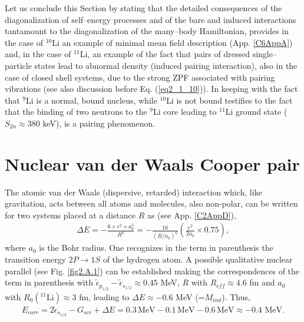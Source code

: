  
 Let us conclude this Section by stating that the detailed consequences  of the diagonalization of self--energy processes and of the bare and induced interactions  tantamount to the diagonalization of the many--body Hamiltonian, provides in the case of $^{10}$Li an example of minimal mean field description  (App. \ref{C6AppA}) and, in the case of $^{11}$Li, an example of the fact that pairs of dressed single--particle states lead to abnormal density (induced pairing interaction), also in the case of closed shell systems, due to the strong ZPF associated with pairing vibrations (see also discussion before Eq. (\ref{eq2_1_10})). In keeping with the fact that $^9$Li is a normal, bound nucleus, while $^{10}$Li is not bound testifies to the fact that the binding of two neutrons to the $^9$Li core leading to $^{11}$Li ground state ($S_{2n}\approx 380$ keV), is a pairing phenomenon. 

 \section{Nuclear van der Waals Cooper pair}\label{C2SG2}
 The atomic van der Waals (dispersive, retarded) interaction which, like gravitation,  acts between all atoms and molecules, also non-polar, can be written for two systems placed at a distance $R$ as (see App. \ref{C2AppD}), 
 \begin{align}\label{eq1C2AppG}
 \Delta E=-\frac{6\times e^2 \times a_0^5}{R^6}=-\frac{16}{(R/a_0)^6}\left(\frac{e^2}{2a_0}\times 0.75\right),
 \end{align}
 where $a_0$ is the Bohr radius. One recognizes in the term in parenthesis the transition energy $2P\to1S$ of the hydrogen atom. A possible qualitative nuclear parallel (see Fig. \ref{fig2.A.1})  can be established making the  correspondences  of the term in parenthesis with $\tilde\epsilon_{p_{1/2}}-\tilde\epsilon_{s_{1/2}}\approx0.45$ MeV, $R$ with $R_{eff}\approx4.6$ fm and $a_0$ with $R_0(^{11}\text{Li})\approx3$ fm, leading to $\Delta E\approx-0.6$ MeV (=$M_{ind}$).
  Thus,
 \begin{align*}
E_{corr}=2\tilde{\epsilon}_{s_{1/2}}-G_{scr}+\Delta E=0.3\,\text{MeV}-0.1\,\text{MeV}-0.6\,\text{MeV}\approx -0.4\text{ MeV}.
 \end{align*} 


